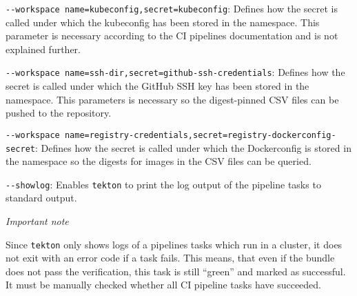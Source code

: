\verb|--workspace name=kubeconfig,secret=kubeconfig|: Defines how the secret is called under which the kubeconfig has been stored in the namespace.
    This parameter is necessary according to the CI pipelines documentation and is not explained further.

\verb|--workspace name=ssh-dir,secret=github-ssh-credentials|: Defines how the secret is called under which the GitHub SSH key has been stored in the namespace.
    This parameters is necessary so the digest-pinned CSV files can be pushed to the repository.

\verb|--workspace name=registry-credentials,secret=registry-dockerconfig-secret|: Defines how the secret is called under which the Dockerconfig is stored in the namespace so the digests for images in the CSV files can be queried.

\verb|--showlog|: Enables \verb|tekton| to print the log output of the pipeline tasks to standard output.

\textit{Important note}

Since \verb|tekton| only shows logs of a pipelines tasks which run in a cluster, it does not exit with an error code if a task fails.
This means, that even if the bundle does not pass the verification, this task is still ``green'' and marked as successful.
It must be manually checked whether all CI pipeline tasks have succeeded.
